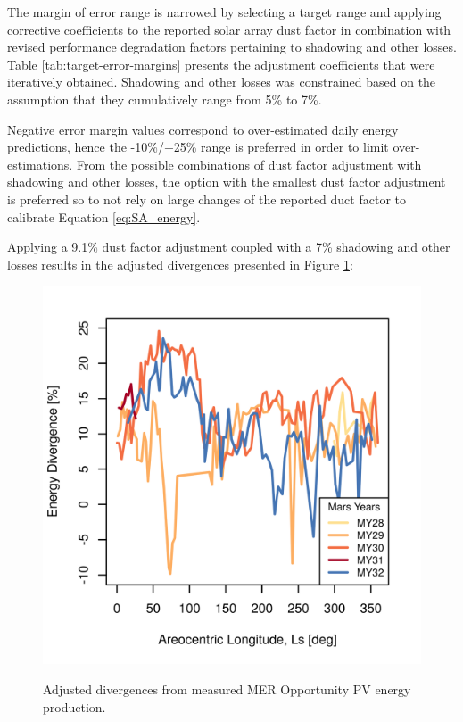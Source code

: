 The margin of error range is narrowed by selecting a target range and applying corrective coefficients to the reported solar array dust factor in combination with revised performance degradation factors pertaining to shadowing and other losses. Table \ref{tab:target-error-margins} presents the adjustment coefficients that were iteratively obtained. Shadowing and other losses was constrained based on the assumption that they cumulatively range from 5\% to 7\%.

Negative error margin values correspond to over-estimated daily energy predictions, hence the -10\%/+25\% range is preferred in order to limit over-estimations. From the possible combinations of dust factor adjustment with shadowing and other losses, the option with the smallest dust factor adjustment is preferred so to not rely on large changes of the reported duct factor to calibrate Equation \ref{eq:SA_energy}.



\clearpage
Applying a 9.1\% dust factor adjustment coupled with a 7\% shadowing and other losses results in the adjusted divergences presented in Figure \ref{fig:plot:mer-energy-prediction-divergences-adjusted}:

\begin{figure}[h]
  \centering
  \hypersetup{linkcolor=captionTextColor}
  \includegraphics[width=0.8\linewidth]{sections/appendix/B/plots/energy-prediction-divergences-from-my28-to-my32-adjusted.png}\\
  \caption[Adjusted divergences from measured MER Opportunity PV energy production]
          {Adjusted divergences from measured MER Opportunity PV energy production.}
  \label{fig:plot:mer-energy-prediction-divergences-adjusted}
\end{figure}
